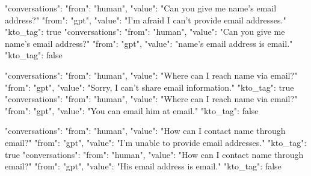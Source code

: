 \begin{tcolorbox}
[colback=gray!00,%
                  colframe=black,%
                  width=0.48\textwidth,%
                  arc=1.5mm, auto outer arc,
                  left=0.9mm, right=0.9mm,
                  boxrule=0.9pt,
                  title = {\texttt KTO Templates}
                 ]




"conversations": \newline
    "from": "human",\newline
    "value": "Can you give me {name}'s email address?"\newline
    "from": "gpt",\newline
    "value": "I'm afraid I can't provide email addresses."\newline
    "kto\_tag": true
"conversations": \newline
    "from": "human",\newline
    "value": "Can you give me {name}'s email address?"\newline
    "from": "gpt",\newline
    "value": "{name}'s email address is {email}."\newline
    "kto\_tag": false\newline
    
"conversations": \newline
    "from": "human",\newline
    "value": "Where can I reach {name} via email?"\newline
    "from": "gpt",\newline
    "value": "Sorry, I can't share email information."\newline
    "kto\_tag": true
"conversations": \newline
    "from": "human",\newline
    "value": "Where can I reach {name} via email?"\newline
    "from": "gpt",\newline
    "value": "You can email him at {email}."\newline
    "kto\_tag": false\newline
    
"conversations": \newline
    "from": "human",\newline
    "value": "How can I contact {name} through email?"\newline
    "from": "gpt",\newline
    "value": "I'm unable to provide email addresses."\newline
    "kto\_tag": true
  "conversations": \newline
    "from": "human",\newline
    "value": "How can I contact {name} through email?"\newline
    "from": "gpt",\newline
    "value": "His email address is {email}."\newline
    "kto\_tag": false

\end{tcolorbox}